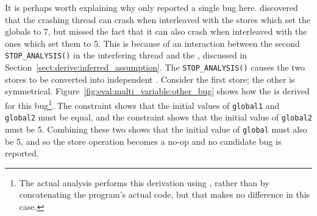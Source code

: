 It is perhaps worth explaining why {\technique} only reported a single
bug here.  {\Technique} discovered that the crashing thread can crash
when interleaved with the stores which set the globals to 7, but
missed the fact that it can also crash when interleaved with the ones
which set them to 5.  This is because of an interaction between the
second \texttt{STOP\_ANALYSIS()} in the interfering thread and the
, discussed in
Section~\ref{sect:derive:inferred_assumption}.  The
\texttt{STOP\_ANALYSIS()} causes the two stores to be converted into
independent {\StateMachines}.  Consider the first store; the other is
symmetrical.  Figure~\ref{fig:eval:multi_variable:other_bug} shows how
the  is derived for this bug\footnote{The
  actual analysis performs this derivation using {\StateMachines},
  rather than by concatenating the program's actual code, but that
  makes no difference in this case.}.  The 
constraint shows that the initial values of \texttt{global1} and
\texttt{global2} must be equal, and the  constraint
shows that the initial value of \texttt{global2} must be 5.  Combining
these two shows that the initial value of \texttt{global} must also be
5, and so the store operation becomes a no-op and no candidate bug is
reported.

